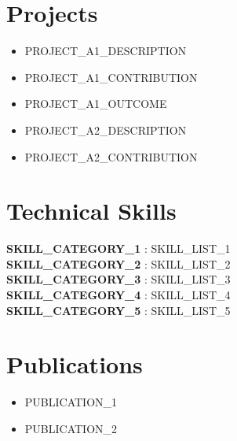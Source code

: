 \section{Projects}

\begin{itemize}
    \item {{PROJECT_A1_DESCRIPTION}}
    \item {{PROJECT_A1_CONTRIBUTION}}
    \item {{PROJECT_A1_OUTCOME}}
\end{itemize}


\begin{itemize}
    \item {{PROJECT_A2_DESCRIPTION}}
    \item {{PROJECT_A2_CONTRIBUTION}}
\end{itemize}

\section{Technical Skills}
\begin{itemize}[leftmargin=0.15in, label={}]
    \small{\item{
        \textbf{ {{SKILL_CATEGORY_1}} }{: {{SKILL_LIST_1}} } \\
        \textbf{ {{SKILL_CATEGORY_2}} }{: {{SKILL_LIST_2}} } \\
        \textbf{ {{SKILL_CATEGORY_3}} }{: {{SKILL_LIST_3}} } \\
        \textbf{ {{SKILL_CATEGORY_4}} }{: {{SKILL_LIST_4}} } \\
        \textbf{ {{SKILL_CATEGORY_5}} }{: {{SKILL_LIST_5}} }
    }}
\end{itemize}

\section{Publications}
\begin{itemize}[leftmargin=0.15in]
    \item \small{ {{PUBLICATION_1}} }
    \item \small{ {{PUBLICATION_2}} }
\end{itemize}

